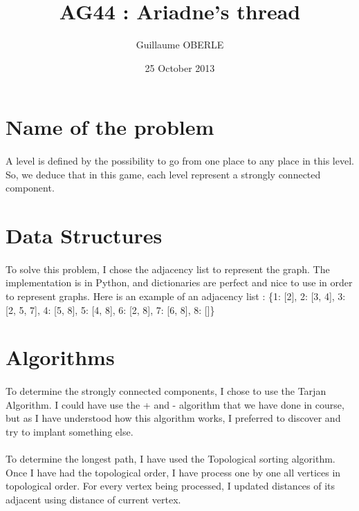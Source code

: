 \documentclass{article}
\title{AG44 : Ariadne's thread}
\author{Guillaume OBERLE}
\date{25 October 2013}
\begin{document}
\maketitle

\section{Name of the problem}
    \paragraph{}
        A level is defined by the possibility to go from one place to any place in this level. So, we deduce that in this game, each level represent a strongly connected component.

\section{Data Structures}
    \paragraph{}
        To solve this problem, I chose the adjacency list to represent the graph. The implementation is in Python, and dictionaries are perfect and nice to use in order to represent graphs. Here is an example of an adjacency list :
        \newline{}
        \newline{}
        \{1: [2], 2: [3, 4], 3: [2, 5, 7], 4: [5, 8], 5: [4, 8], 6: [2, 8], 7: [6, 8], 8: []\}

\section{Algorithms}
    \paragraph{}
        To determine the strongly connected components, I chose to use the Tarjan Algorithm. I could have use the + and - algorithm that we have done in course, but as I have understood how this algorithm works, I preferred to discover and try to implant something else.
    \paragraph{}
        To determine the longest path, I have used the Topological sorting algorithm. Once I have had the topological order, I have process one by one all vertices in topological order. For every vertex being processed, I updated distances of its adjacent using distance of current vertex.
\end{document}
